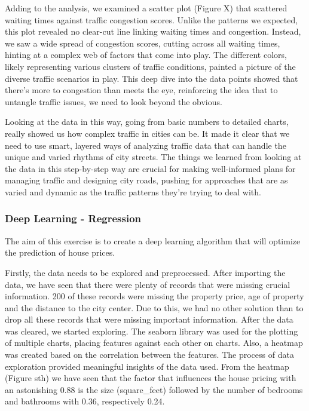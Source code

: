\documentclass{article}
\begin{document}
\begin{multicols}{2}
Adding to the analysis, we examined a scatter plot (Figure X) that scattered waiting times against traffic congestion scores. Unlike the patterns we expected, this plot revealed no clear-cut line linking waiting times and congestion. Instead, we saw a wide spread of congestion scores, cutting across all waiting times, hinting at a complex web of factors that come into play. The different colors, likely representing various clusters of traffic conditions, painted a picture of the diverse traffic scenarios in play. This deep dive into the data points showed that there's more to congestion than meets the eye, reinforcing the idea that to untangle traffic issues, we need to look beyond the obvious.

Looking at the data in this way, going from basic numbers to detailed charts, really showed us how complex traffic in cities can be. It made it clear that we need to use smart, layered ways of analyzing traffic data that can handle the unique and varied rhythms of city streets. The things we learned from looking at the data in this step-by-step way are crucial for making well-informed plans for managing traffic and designing city roads, pushing for approaches that are as varied and dynamic as the traffic patterns they're trying to deal with.

\subsubsection{Deep Learning - Regression}

The aim of this exercise is to create a deep learning algorithm that will optimize the prediction of house prices.

Firstly, the data needs to be explored and preprocessed. After importing the data, we have seen that there were plenty of records that were missing crucial information. 200 of these records were missing the property price, age of property and the distance to the city center. Due to this, we had no other solution than to drop all these records that were missing important information. After the data was cleared, we started exploring. The seaborn library was used for the plotting of multiple charts, placing features against each other on charts. Also, a heatmap was created based on the correlation between the features. The process of data exploration provided meaningful insights of the data used. From the heatmap (Figure sth) we have seen that the factor that influences the house pricing with an astonishing 0.88 is the size (square\_feet) followed by the number of bedrooms and bathrooms with 0.36, respectively 0.24.


\end{multicols}
\end{document}
